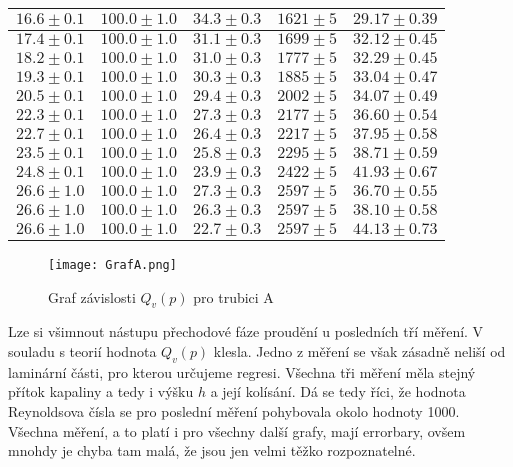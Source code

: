 \documentclass[a4paper]{article}
\begin{document}
\begin{center}
\begin{tabular}{ | c | c | c | c |  p{3cm} |}
    $16.6\pm0.1$ & $100.0\pm1.0$ & $34.3\pm0.3$ & $1621\pm5$ & $29.17\pm0.39$ \\ \hline
    $17.4\pm0.1$ & $100.0\pm1.0$ & $31.1\pm0.3$ & $1699\pm5$ & $32.12\pm0.45$ \\ \hline
    $18.2\pm0.1$ & $100.0\pm1.0$ & $31.0\pm0.3$ & $1777\pm5$ & $32.29\pm0.45$ \\ \hline
    $19.3\pm0.1$ & $100.0\pm1.0$ & $30.3\pm0.3$ & $1885\pm5$ & $33.04\pm0.47$ \\ \hline
    $20.5\pm0.1$ & $100.0\pm1.0$ & $29.4\pm0.3$ & $2002\pm5$ & $34.07\pm0.49$ \\ \hline
    $22.3\pm0.1$ & $100.0\pm1.0$ & $27.3\pm0.3$ & $2177\pm5$ & $36.60\pm0.54$ \\ \hline
    $22.7\pm0.1$ & $100.0\pm1.0$ & $26.4\pm0.3$ & $2217\pm5$ & $37.95\pm0.58$ \\ \hline
    $23.5\pm0.1$ & $100.0\pm1.0$ & $25.8\pm0.3$ & $2295\pm5$ & $38.71\pm0.59$ \\ \hline
    $24.8\pm0.1$ & $100.0\pm1.0$ & $23.9\pm0.3$ & $2422\pm5$ & $41.93\pm0.67$ \\ \hline
    $26.6\pm1.0$ & $100.0\pm1.0$ & $27.3\pm0.3$ & $2597\pm5$ & $36.70\pm0.55$ \\ \hline
    $26.6\pm1.0$ & $100.0\pm1.0$ & $26.3\pm0.3$ & $2597\pm5$ & $38.10\pm0.58$ \\ \hline
    $26.6\pm1.0$ & $100.0\pm1.0$ & $22.7\pm0.3$ & $2597\pm5$ & $44.13\pm0.73$ \\ \hline
    \end{tabular}
\end{center}
\begin{figure}[H]
\centering
\texttt{[image: GrafA.png]}
\caption{Graf závislosti $Q_{v}(p)$ pro trubici A}
\end{figure}
\par Lze si všimnout nástupu přechodové fáze proudění u posledních tří měření. V souladu s teorií hodnota $Q_{v}(p)$ klesla. Jedno z měření se však zásadně neliší od laminární části, pro kterou určujeme regresi. Všechna tři měření měla stejný přítok kapaliny a tedy i výšku $h$ a její kolísání. Dá se tedy říci, že hodnota Reynoldsova čísla se pro poslední měření pohybovala okolo hodnoty 1000. Všechna měření, a to platí i pro všechny další grafy, mají errorbary, ovšem mnohdy je chyba tam malá, že jsou jen velmi těžko rozpoznatelné.
\end{document}
